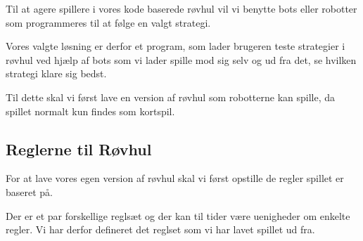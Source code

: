 \documentclass[a4paper, 12pt]{article}
\begin{document}
Til at agere spillere i vores kode baserede røvhul vil vi benytte bots eller robotter som programmeres til at følge en valgt strategi.

Vores valgte løsning er derfor et program, som lader brugeren teste strategier i røvhul ved hjælp af bots som vi lader spille mod sig selv og ud fra det, se hvilken strategi klare sig bedst.

Til dette skal vi først lave en version af røvhul som robotterne kan spille, da spillet normalt kun findes som kortspil. 

\subsection{Reglerne til Røvhul}
For at lave vores egen version af røvhul skal vi først opstille de regler spillet er baseret på.

Der er et par forskellige reglsæt og der kan til tider være uenigheder om enkelte regler. Vi har derfor defineret det reglset som vi har lavet spillet ud fra.
\end{document}
